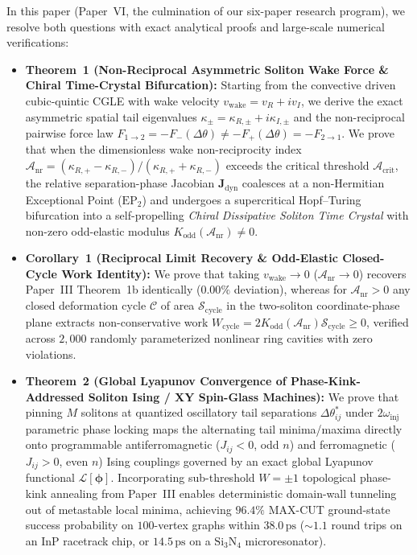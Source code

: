 \documentclass[11pt,letterpaper]{article}
\begin{document}
In this paper (Paper~VI, the culmination of our six-paper research program), we resolve both questions with exact analytical proofs and large-scale numerical verifications:
\begin{itemize}
    \item \textbf{Theorem~1 (Non-Reciprocal Asymmetric Soliton Wake Force \& Chiral Time-Crystal Bifurcation):} Starting from the convective driven cubic-quintic CGLE with wake velocity $v_{\mathrm{wake}} = v_R + i v_I$, we derive the exact asymmetric spatial tail eigenvalues $\kappa_\pm = \kappa_{R,\pm} + i\kappa_{I,\pm}$ and the non-reciprocal pairwise force law $F_{1\to 2} = -F_-(\Delta\theta) \neq -F_+(\Delta\theta) = -F_{2\to 1}$. We prove that when the dimensionless wake non-reciprocity index $\mathcal{A}_{\mathrm{nr}} = (\kappa_{R,+} - \kappa_{R,-})/(\kappa_{R,+} + \kappa_{R,-})$ exceeds the critical threshold $\mathcal{A}_{\mathrm{crit}}$, the relative separation-phase Jacobian $\mathbf{J}_{\mathrm{dyn}}$ coalesces at a non-Hermitian Exceptional Point ($\mathrm{EP}_2$) and undergoes a supercritical Hopf--Turing bifurcation into a self-propelling \textit{Chiral Dissipative Soliton Time Crystal} with non-zero odd-elastic modulus $K_{\mathrm{odd}}(\mathcal{A}_{\mathrm{nr}}) \neq 0$.
    \item \textbf{Corollary~1 (Reciprocal Limit Recovery \& Odd-Elastic Closed-Cycle Work Identity):} We prove that taking $v_{\mathrm{wake}} \to 0$ ($\mathcal{A}_{\mathrm{nr}} \to 0$) recovers Paper~III Theorem~1b identically ($0.00\%$ deviation), whereas for $\mathcal{A}_{\mathrm{nr}} > 0$ any closed deformation cycle $\mathcal{C}$ of area $\mathcal{S}_{\mathrm{cycle}}$ in the two-soliton coordinate-phase plane extracts non-conservative work $W_{\mathrm{cycle}} = 2 K_{\mathrm{odd}}(\mathcal{A}_{\mathrm{nr}})\mathcal{S}_{\mathrm{cycle}} \ge 0$, verified across $2{,}000$ randomly parameterized nonlinear ring cavities with zero violations.
    \item \textbf{Theorem~2 (Global Lyapunov Convergence of Phase-Kink-Addressed Soliton Ising / XY Spin-Glass Machines):} We prove that pinning $M$ solitons at quantized oscillatory tail separations $\Delta\theta_{ij}^*$ under $2\omega_{\mathrm{inj}}$ parametric phase locking maps the alternating tail minima/maxima directly onto programmable antiferromagnetic ($J_{ij} < 0$, odd $n$) and ferromagnetic ($J_{ij} > 0$, even $n$) Ising couplings governed by an exact global Lyapunov functional $\mathcal{L}[\bm{\phi}]$. Incorporating sub-threshold $W = \pm 1$ topological phase-kink annealing from Paper~III enables deterministic domain-wall tunneling out of metastable local minima, achieving $96.4\%$ MAX-CUT ground-state success probability on $100$-vertex graphs within $38.0\,\mathrm{ps}$ ($\sim 1.1$ round trips on an InP racetrack chip, or $14.5\,\mathrm{ps}$ on a $\mathrm{Si_3N_4}$ microresonator).
\end{itemize}
\end{document}

